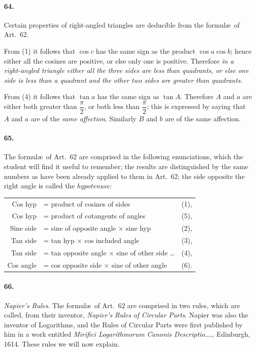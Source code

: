 \documentclass{book}[2004/02/16]
\begin{document}
\begin{mainmatter}
\begin{spacing}{1.3}
\paragraph{64.} Certain properties of right-angled triangles are deducible
from the formul\ae\ of Art.~62.

From (1) it follows that $\cos c$ has the same sign as the product
$\cos a\cos b$; hence either all the cosines are positive, or else only
one is positive. Therefore \textit{in a right-angled triangle either all the
three sides are less than quadrants, or else one side is less than a
quadrant and the other two sides are greater than quadrants.}

From (4) it follows that $\tan a$ has the same sign as $\tan A$.
Therefore $A$ and $a$ are either both greater than $\dfrac{\pi}{2}$, or both less
than $\dfrac{\pi}{2}$; this is expressed by saying that $A$ and $a$ are of the \textit{same
affection}. Similarly $B$ and $b$ are of the same affection.

\paragraph{65.} The formul\ae\ of Art.~62 are comprised in the following
enunciations, which the student will find it useful to remember;
the results are distinguished by the same numbers as have been
already applied to them in Art.~62; the side opposite the right
angle is called the \textit{hypotenuse:}
\begin{center}
\begin{tabular}{r@{\ }l@{}l}
  Cos hyp &= product of cosines of sides \dotfill&(1),\\[1ex]
  Cos hyp &= product of cotangents of angles \dotfill&(5),\\[1ex]
  Sine side &= sine of opposite angle $\times$ sine hyp \dotfill&(2),\\[1ex]
  Tan side &= tan hyp $\times$ cos included angle \dotfill&(3),\\[1ex]
  Tan side &= tan opposite angle $\times$ sine of other side \ldots\dotfill&(4),\\[1ex]
  Cos angle &= cos opposite side $\times$ sine of other angle \dotfill&(6).
\end{tabular}
\end{center}

\paragraph{66.} \textit{Napier's Rules}. The formul\ae\ of Art.~62 are comprised
in two rules, which are called, from their inventor, \textit{Napier's Rules
of Circular Parts}. Napier was also the inventor of Logarithms,
and the Rules of Circular Parts were first published by him in a
work entitled \textit{Mirifici Logarithmorum Canonis Descriptio}\dots\dots
Edinburgh, 1614. These rules we will now explain.


\end{spacing}
\end{mainmatter}
\end{document}
